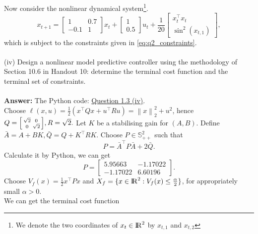 \documentclass[a4paper,11pt,reqno]{amsart}
\newcommand{\R}{{\rm I\!R}}
\newcommand{\tran}{\intercal}
\begin{document}
Now consider the nonlinear dynamical system\footnote[2]{We denote the two coordinates of $x_t\in\R^2$ by $x_{t,1}$ and $x_{t,2}$}.
\begin{equation}
    x_{t+1}=
    \begin{bmatrix}
        1&0.7\\
        -0.1&1
    \end{bmatrix}
    x_t+
    \begin{bmatrix}
        1\\
        0.5
    \end{bmatrix}
    u_t+
    \frac{1}{20}
    \begin{bmatrix}
        x_t^{\tran}x_t\\
        \sin^2(x_{t,1})
    \end{bmatrix},
\end{equation}
which is subject to the constraints given in \eqref{eq:q2_constraints}.
\\ \\
(iv) Design a nonlinear model predictive controller using the methodology of Section 10.6 in Handout 10: determine the terminal cost function and the terminal set of constraints.
\\ \\
\textbf{Answer:} 
The Python code: \href{https://github.com/Gczmy/ELE8088/blob/main/Coursework1/Python_code/3_iv.py}{Question 1.3 (iv)}.
\\
Choose $\ell(x,u)=\tfrac{1}{2}(x^{\tran}Qx+u^{\tran}Ru)=\left\lVert x\right\rVert ^2_2+u^2$, hence $Q=\begin{bsmallmatrix}\sqrt{2}&0\\0&\sqrt{2}\end{bsmallmatrix},R=\sqrt{2}.$
Let $K$ be a stabilising gain for $(A, B)$. Define $\bar{A} = A + BK, \bar{Q} = Q + K^{\tran}RK$. Choose $P\in\mathbb{S}^2_{++}$ such that
\begin{equation}
    P=\bar{A}^{\tran}P\bar{A}+2\bar{Q}.
\end{equation}
Calculate it by Python, we can get
\begin{equation}
    P=
    \begin{bmatrix}
        5.95663&-1.17022\\
        -1.17022&6.60196
    \end{bmatrix}.
\end{equation}
Choose $V_f(x)=\tfrac{1}{2}x^{\tran}Px$ and $X_f=\{x\in\R^2:V_f(x)\leq\tfrac{\alpha}{2}\}$, for appropriately small $\alpha>0$.
\\
We can get the terminal cost function
\end{document}
